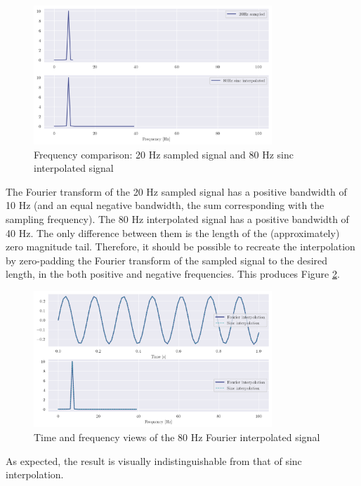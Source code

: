 \documentclass[a4paper, 11pt]{article}
\begin{document}
\begin{figure}[ht]
    \centering
    \includegraphics[width=0.8\textwidth]{images/q7_freqcompare.png}
    \caption{Frequency comparison: 20 Hz sampled signal and 80 Hz sinc
        interpolated signal}
    \label{fig:q7_freqcompare}
\end{figure}

The Fourier transform of the 20 Hz sampled signal has a positive bandwidth of
10 Hz (and an equal negative bandwidth, the sum corresponding with the sampling
frequency). The 80 Hz interpolated signal has a positive bandwidth of 40 Hz.
The only difference between them is the length of the (approximately) zero
magnitude tail. Therefore, it should be possible to recreate the interpolation
by zero-padding the Fourier transform of the sampled signal to the desired
length, in the both positive and negative frequencies. This produces Figure
\ref{fig:q7_upsample}.

\begin{figure}[ht]
    \centering
    \includegraphics[width=0.8\textwidth]{images/q7_upsampled.png}
    \caption{Time and frequency views of the 80 Hz Fourier interpolated signal}
    \label{fig:q7_upsample}
\end{figure}

As expected, the result is visually indistinguishable from that of sinc
interpolation.
\end{document}
